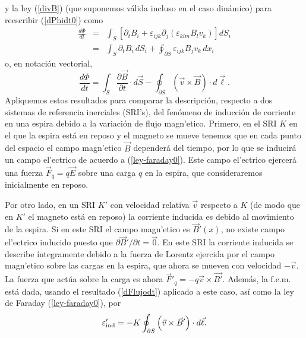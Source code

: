 y la ley (\ref{divB}) (que suponemos válida incluso en el caso dinámico) para reescribir (\ref{dPhidt0}) como
\begin{eqnarray}
 \frac{d\Phi}{dt}&=&\int_S\left[\partial_tB_i+\varepsilon_{ijk}
\partial_j(\varepsilon_{klm} B_lv_k)\right] dS_i \\
&=& \int_S\partial_tB_i\, dS_i +\oint_{\partial S}\varepsilon_{ijk}
B_jv_k\,dx_i 
\end{eqnarray}
o, en notación vectorial, 
\begin{equation}\label{dFlujodt}
  \frac{d\Phi}{dt}=\int_S\frac{\partial\vec{B}}{\partial
t}\cdot d\vec{S}-\oint_{\partial
S}\left(\vec{v}\times\vec{B}\right)\cdot d\vec{\ell}.
\end{equation}
Apliquemos estos resultados para comparar la descripción, respecto a dos sistemas de referencia inerciales (SRI's), del fenómeno de inducción de corriente en una espira debido a la variación de flujo magn'etico. Primero, en el SRI $K$ en el que la espira está en reposo y el magneto se mueve tenemos que en cada punto del espacio el campo magn'etico $\vec{B}$ dependerá del tiempo, por lo que se inducirá un campo el'ectrico de acuerdo a (\ref{ley-faraday0}). Este campo el'ectrico ejercerá una fuerza $\vec{F}_q=q\vec{E}$ sobre una carga $q$ en la espira, que consideraremos inicialmente en reposo. 

Por otro lado, en un SRI $K'$ con velocidad relativa $\vec{v}$ respecto a $K$ (de modo que en $K'$ el magneto está en reposo) la corriente inducida es debido al movimiento de la espira. Si en este SRI el campo magn'etico es $\vec{B}'(x)$, no existe campo el'ectrico inducido puesto que $\partial\vec{B}'/\partial t=\vec{0}$. En este SRI la corriente inducida se describe íntegramente debido a la fuerza de Lorentz ejercida por el campo magn'etico sobre las cargas en la espira, que ahora se mueven con velocidad $-\vec{v}$. La fuerza que actúa sobre la carga es ahora $\vec{F}'_q=-q\vec{v}\times\vec{B'}$. Además, la f.e.m. está dada, usando el resultado (\ref{dFlujodt}) aplicado a este caso, así como la ley de Faraday (\ref{ley-faraday0}), por 
\begin{equation}
\varepsilon'_{\rm ind}=-K\oint_{\partial S}\left(\vec{v}\times\vec{B}'\right)\cdot d\vec{\ell}.
\end{equation}

